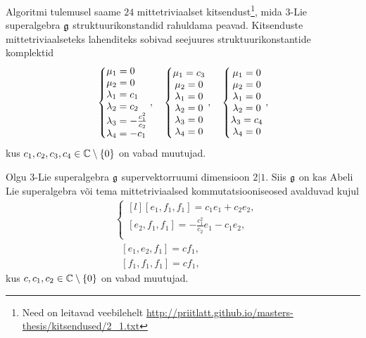 Algoritmi tulemusel saame $24$ mittetriviaalset
kitsendust\footnote{Need on leitavad veebilehelt
\url{http://priitlatt.github.io/masters-thesis/kitsendused/2_1.txt}},
mida $3$-Lie superalgebra $\mathfrak{g}$ struktuurikonstandid rahuldama peavad.
Kitsenduste mittetriviaalseteks lahenditeks sobivad seejuures
struktuurikonstantide komplektid
\renewcommand\arraystretch{1.3}
\begin{align*}
    \left\{ \begin{matrix*}[l]
        \m_1 = 0 \\
        \m_2 = 0 \\
        \l_1 = c_1 \\
        \l_2 = c_2 \\
        \l_3 = -\frac{c_1^2}{c_2} \\
        \l_4 = -c_1 \\
    \end{matrix*} \right.,
    \quad
    \left\{ \begin{matrix*}
        \m_1 = c_3 \\
        \m_2 = 0 \\
        \l_1 = 0 \\
        \l_2 = 0 \\
        \l_3 = 0 \\
        \l_4 = 0 \\
    \end{matrix*} \right.,
    \quad
    \left\{ \begin{matrix*}
        \m_1 = 0 \\
        \m_2 = 0 \\
        \l_1 = 0 \\
        \l_2 = 0 \\
        \l_3 = c_4 \\
        \l_4 = 0 \\
    \end{matrix*} \right.,
\end{align*}
\renewcommand\arraystretch{1}
kus $c_1, c_2, c_3, c_4 \in \mathbb{C} \setminus \{0\}$ on vabad muutujad.

\begin{lau}
    Olgu $3$-Lie superalgebra $\mathfrak{g}$ supervektorruumi dimensioon $2|1$.
    Siis $\mathfrak{g}$ on kas Abeli Lie superalgebra või tema mittetriviaalsed
    kommutatsiooniseosed avalduvad kujul
    \renewcommand\arraystretch{1.2}
    \begin{align}
        & \left\{
            \begin{matrix*}[l]
                [e_1, f_1, f_1] = c_1 e_1 + c_2 e_2, \\
                [e_2, f_1, f_1] = -\frac{c_1^2}{c_2} e_1 - c_1 e_2, \\
            \end{matrix*}
        \right. \label{samasus:2|1 - 1} \\[0.2cm]
        &\ \ \ [e_1, e_2, f_1] = c f_1, \label{samasus:2|1 - 2} \\[0.2cm]
        &\ \ \ [f_1, f_1, f_1] = c f_1, \label{samasus:2|1 - 3}
    \end{align}
    \renewcommand\arraystretch{1}
    kus $c, c_1, c_2 \in \mathbb{C} \setminus \{ 0 \}$ on vabad muutujad.
\end{lau}

